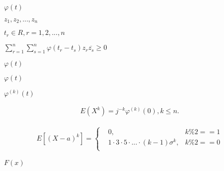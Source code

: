 \begin{preview}
\setcounter{equation}{0}%
\(\varphi(t)\)
\end{preview}

\begin{preview}
\setcounter{equation}{0}%
\(z_1, z_2, ..., z_n\)
\end{preview}

\begin{preview}
\setcounter{equation}{0}%
\(t_r \in R, r = 1, 2, ..., n\)
\end{preview}

\begin{preview}
\setcounter{equation}{0}%
\(\sum^n_{r=1} \sum^n_{s = 1} \varphi(t_r - t_s) z_r \overline{z_s} \geq 0\)
\end{preview}

\begin{preview}
\setcounter{equation}{0}%
\(\varphi(t)\)
\end{preview}

\begin{preview}
\setcounter{equation}{0}%
\(\varphi(t)\)
\end{preview}

\begin{preview}
\setcounter{equation}{0}%
\(\varphi^{(k)}(t)\)
\end{preview}

\begin{preview}
\setcounter{equation}{0}%
\begin{align}
  E(X^k) = j^{-k} \varphi^{(k)}(0), k \leq n.
\end{align}

\end{preview}

\begin{preview}
\setcounter{equation}{0}%
\begin{align}
E[(X-a)^k] =
\left\{
\begin{aligned}
&0, &k \% 2 == 1\\
&1 \cdot 3 \cdot 5 \cdot ...  \cdot (k-1)\sigma^k, & k \% 2 == 0\\
\end{aligned}
\right.
\end{align}

\end{preview}

\begin{preview}
\setcounter{equation}{0}%
\(F(x)\)
\end{preview}

